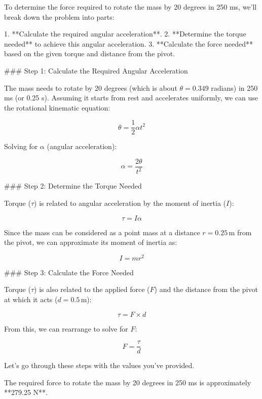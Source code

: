 To determine the force required to rotate the mass by 20 degrees in 250 ms, we'll break down the problem into parts:

1. **Calculate the required angular acceleration**.
2. **Determine the torque needed** to achieve this angular acceleration.
3. **Calculate the force needed** based on the given torque and distance from the pivot.

### Step 1: Calculate the Required Angular Acceleration

The mass needs to rotate by 20 degrees (which is about \( \theta = 0.349 \) radians) in 250 ms (or 0.25 s). Assuming it starts from rest and accelerates uniformly, we can use the rotational kinematic equation:

\[
\theta = \frac{1}{2} \alpha t^2
\]

Solving for \( \alpha \) (angular acceleration):

\[
\alpha = \frac{2\theta}{t^2}
\]

### Step 2: Determine the Torque Needed

Torque (\( \tau \)) is related to angular acceleration by the moment of inertia (\( I \)):

\[
\tau = I \alpha
\]

Since the mass can be considered as a point mass at a distance \( r = 0.25 \, \text{m} \) from the pivot, we can approximate its moment of inertia as:

\[
I = m r^2
\]

### Step 3: Calculate the Force Needed

Torque (\( \tau \)) is also related to the applied force (\( F \)) and the distance from the pivot at which it acts (\( d = 0.5 \, \text{m} \)):

\[
\tau = F \times d
\]

From this, we can rearrange to solve for \( F \):

\[
F = \frac{\tau}{d}
\]

Let’s go through these steps with the values you’ve provided.

The required force to rotate the mass by 20 degrees in 250 ms is approximately **279.25 N**.